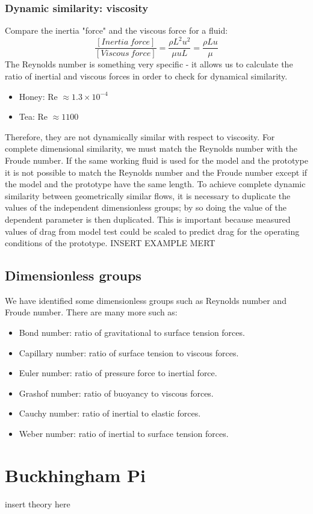 \documentclass[class=report, crop=false, 12pt,a4paper]{standalone}
\begin{document}
\subsubsection{Dynamic similarity: viscosity}
Compare the inertia "force" and the viscous force for a fluid:
\[ \frac{[Inertia \ force]}{[Viscous \ force]} = \frac{\rho L^2 u^2}{\mu u L} = \frac{\rho L u }{\mu} \]
The Reynolds number is something very specific - it allows us to calculate the ratio of inertial and viscous forces in order to check for dynamical similarity.
\begin{itemize}[noitemsep]
  \item Honey: Re \(\approx 1.3 \times 10^{-4}\)
  \item Tea: Re \(\approx 1100 \)
\end{itemize}
Therefore, they are not dynamically similar with respect to viscosity. 
For complete dimensional similarity, we must match the Reynolds number with the Froude number. If the same working fluid is used for the model and the prototype it is not possible to match the Reynolds number and the Froude number except if the model and the prototype have the same length. To achieve complete dynamic similarity between geometrically similar flows, it is necessary to duplicate the values of the independent dimensionless groups; by so doing the value of the dependent parameter is then duplicated. This is important because measured values of drag from model test could be scaled to predict drag for the operating conditions of the prototype. INSERT EXAMPLE MERT
\subsection{Dimensionless groups}
We have identified some dimensionless groups such as Reynolds number and Froude number. There are many more such as:
\begin{itemize}[noitemsep]
  \item Bond number: ratio of gravitational to surface tension forces.
  \item Capillary number: ratio of surface tension to viscous forces.
  \item Euler number: ratio of pressure force to inertial force.
  \item Grashof number: ratio of buoyancy to viscous forces.
  \item Cauchy number: ratio of inertial to elastic forces.
  \item Weber number: ratio of inertial to surface tension forces.
\end{itemize}
\section{Buckhingham Pi}
insert theory here
\end{document}

